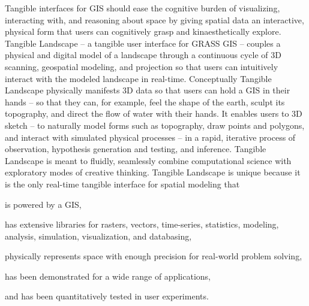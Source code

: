 \documentclass[prodmode,acmtochi]{acmsmall} %
\begin{document}
Tangible interfaces for GIS 
should ease the cognitive burden of 
visualizing, interacting with, 
and reasoning about space
by giving spatial data an interactive, physical form 
that users can cognitively grasp and kinaesthetically explore. 
%
Tangible Landscape -- a tangible user interface for GRASS GIS --
couples a physical and digital model of a landscape through a continuous cycle of 3D scanning, geospatial modeling, and projection
so that users can intuitively interact with the modeled landscape in real-time.
%
Conceptually Tangible Landscape physically manifests 3D data 
so that users can hold a GIS in their hands -- 
so that they can, for example, feel the shape of the earth, sculpt its topography, and direct the flow of water with their hands.
%
It enables users to 3D sketch -- 
to naturally model forms such as topography, 
draw points and polygons, 
and interact with simulated physical processes -- 
in a rapid, iterative process 
of observation, hypothesis generation and testing, and inference. 
%
Tangible Landscape is meant to fluidly, seamlessly combine
computational science with exploratory modes of creative thinking.
%
Tangible Landscape is unique because it is the only 
real-time tangible interface for spatial modeling that 
\begin{enumerate*}
\item is powered by a GIS,
\item has extensive libraries for rasters, vectors, time-series, statistics, modeling, analysis, simulation, visualization, and databasing, 
\item physically represents space with enough precision for real-world problem solving,
\item has been demonstrated for a wide range of applications,
\item and has been quantitatively tested in user experiments. 
\end{enumerate*}
\end{document}
